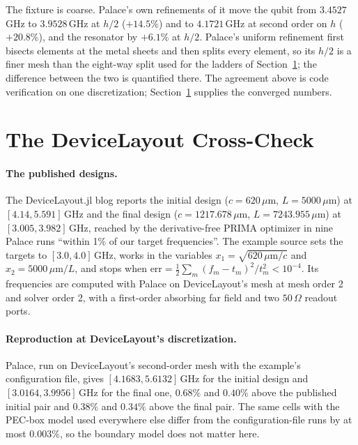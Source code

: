 \documentclass{anvil-paper}
\begin{document}
The fixture is coarse. Palace's own refinements of it move the qubit from
$3.4527$\,GHz to $3.9528$\,GHz at $h/2$ ($+14.5\%$) and to $4.1721$\,GHz
at second order on $h$ ($+20.8\%$), and the resonator by $+6.1\%$ at
$h/2$. Palace's uniform refinement first bisects elements at the metal
sheets and then splits every element, so its $h/2$ is a finer mesh than the
eight-way split used for the ladders of Section~\ref{sec:crosscheck}; the
difference between the two is quantified there. The agreement above is code
verification on one discretization; Section~\ref{sec:crosscheck} supplies
the converged numbers.

\section{The DeviceLayout Cross-Check}
\label{sec:crosscheck}

\paragraph{The published designs.}
The DeviceLayout.jl blog \citep{devicelayout-blog} reports the initial
design ($c = 620\,\mu$m, $L = 5000\,\mu$m) at $[4.14, 5.591]$\,GHz and
the final design ($c = 1217.678\,\mu$m, $L = 7243.955\,\mu$m) at
$[3.005, 3.982]$\,GHz, reached by the derivative-free PRIMA optimizer in
nine Palace runs ``within 1\% of our target frequencies''. The example
source \citep{devicelayout-example} sets the targets to $[3.0, 4.0]$\,GHz,
works in the variables $x_1 = \sqrt{620\,\mu\mathrm{m}/c}$ and $x_2 =
5000\,\mu\mathrm{m}/L$, and stops when $\mathrm{err} = \frac12\sum_m
(f_m - t_m)^2/t_m^2 < 10^{-4}$. Its frequencies are computed with Palace
on DeviceLayout's mesh at mesh order 2 and solver order 2, with a
first-order absorbing far field and two $50\,\Omega$ readout ports.

\paragraph{Reproduction at DeviceLayout's discretization.}
Palace, run on DeviceLayout's second-order mesh with the example's
configuration file, gives $[4.1683, 5.6132]$\,GHz for the initial design
and $[3.0164, 3.9956]$\,GHz for the final one, $0.68\%$ and $0.40\%$
above the published initial pair and $0.38\%$ and $0.34\%$ above the
final pair. The same cells with the PEC-box model used everywhere else
differ from the configuration-file runs by at most $0.003\%$, so the
boundary model does not matter here.
\end{document}
